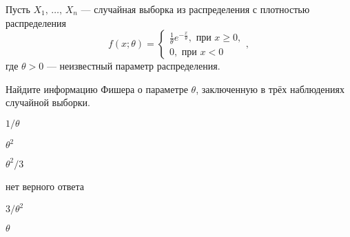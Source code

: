 
\begin{question}
Пусть \(X_1, \, \ldots, \, X_n\) --- случайная выборка из распределения
с плотностью распределения \[
f(x; \theta) =
\begin{cases}
\frac{1}{\theta} e^{-\frac{x}{\theta}}, \text{ при } x \geq 0, \\
0, \text{ при } x < 0
\end{cases},
\] где \(\theta > 0\) --- неизвестный параметр распределения.

Найдите информацию Фишера о параметре \(\theta\), заключенную в трёх
наблюдениях случайной выборки.
\begin{answerlist}
  \item \(1 / \theta\)
  \item \(\theta^2\)
  \item \(\theta^2 / 3\)
  \item нет верного ответа
  \item \(3 / \theta^2\)
  \item \(\theta\)
\end{answerlist}
\end{question}


